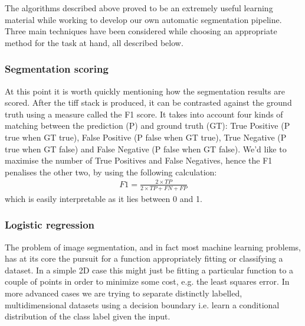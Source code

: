 \documentclass[a4paper, 11pt]{article}
\numberwithin{equation}{section}
\begin{document}
		\noindent The algorithms described above proved to be an extremely useful learning material while working to develop our own automatic segmentation pipeline. Three main techniques have been considered while choosing an appropriate method for the task at hand, all described below.
		
		\subsubsection{Segmentation scoring}
		At this point it is worth quickly mentioning how the segmentation results are scored. After the tiff stack is produced, it can be contrasted against the ground truth using a measure called the F1 score. It takes into account four kinds of matching between the prediction (P) and ground truth (GT): True Positive (P true when GT true), False Positive (P false when GT true), True Negative (P true when GT false) and False Negative (P false when GT false). We'd like to maximise the number of True Positives and False Negatives, hence the F1 penalises the other two, by using the following calculation:
		\begin{align}
		F1 = \frac{2\times TP}{2\times TP + FN + FP}
		\end{align}
		which is easily interpretable as it lies between 0 and 1.
		
		\subsubsection{Logistic regression}
		The problem of image segmentation, and in fact most machine learning problems, has at its core the pursuit for a function appropriately fitting or classifying a dataset. In a simple 2D case this might just be fitting a particular function to a couple of points in order to minimize some cost, e.g. the least squares error. In more advanced cases we are trying to separate distinctly labelled, multidimensional datasets using a decision boundary i.e. learn a conditional distribution of the class label given the input.
		
\end{document}
